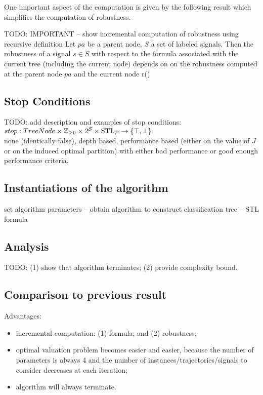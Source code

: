 One important aspect of the computation is
given by the following result which simplifies
the computation of robustness.

\begin{proposition}
{\color{orange}
TODO: IMPORTANT -- show incremental computation of robustness using recursive definition
}
Let $pa$ be a parent node, $S$ a set of
labeled signals. Then the robustness of
a signal $s \in S$ with respect to the
formula associated with the current
tree (including the current node)
depends on on the robustness computed
at the parent node $pa$ and the current
node
r()
\end{proposition}


\subsection{Stop Conditions}
\label{sec:stop-condition}

{\color{orange}
TODO: add description and examples of stop conditions:\\
$stop: TreeNode \times \mathbb{Z}_{\geq 0} \times 2^{\mathcal{S}} \times \text{STL}_{\mathcal{P}} \to \{\top, \perp\} $\\
none (identically false), depth based, performance based
(either on the value of $J$ or on the induced optimal partition)
with either bad performance or good enough performance criteria.
}

\subsection{Instantiations of the algorithm}
\label{sec:alg-instances}

{\color{orange}
set algorithm parameters -- obtain algorithm
to construct classification tree -- STL formula
}

\subsection{Analysis}
\label{sec:analysis}

TODO: (1) show that algorithm terminates; (2) provide complexity bound.

\subsection{Comparison to previous result}
\label{sec:comp-pSTL}

Advantages:
\begin{itemize}
    \item incremental computation: (1) formula; and (2) robustness;
    \item optimal valuation problem becomes easier and easier, because the number of parameters is always 4
    and the number of instances/trajectories/signals to consider decreases at each iteration;
    \item algorithm will always terminate.
\end{itemize}
